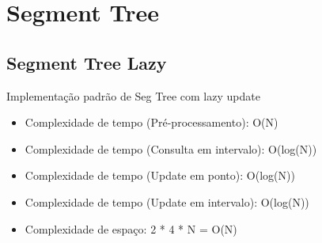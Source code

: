 \documentclass[11pt, a4paper, oneside]{book}
\begin{document}
\hfill

\section{Segment Tree}
\subsection{Segment Tree Lazy}


Implementação padrão de Seg Tree com lazy update



\begin{itemize}
\item Complexidade de tempo (Pré-processamento): O(N)
\item Complexidade de tempo (Consulta em intervalo): O(log(N))
\item Complexidade de tempo (Update em ponto): O(log(N))
\item Complexidade de tempo (Update em intervalo): O(log(N))
\item Complexidade de espaço: 2 * 4 * N = O(N)
\end{itemize}

\hfill
\end{document}
